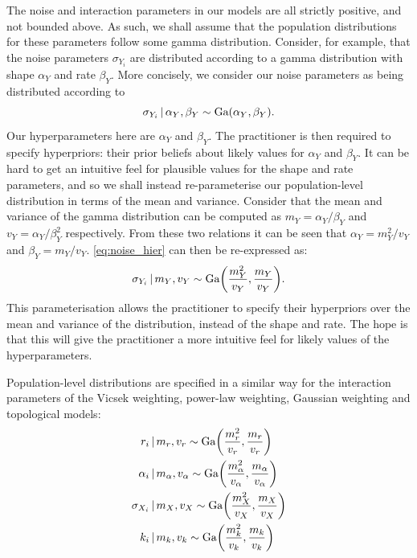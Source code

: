 The noise and interaction parameters in our models are all strictly positive,
and not bounded above. As such, we shall assume that the population
distributions for these parameters follow some gamma distribution. Consider,
for example, that the noise parameters $\sigma_{Y_i}$ are distributed according
to a gamma distribution with shape $\alpha_Y$ and rate $\beta_Y$. More
concisely, we consider our noise parameters as being distributed according to
\begin{equation}
    \label{eq:noise_hier}
    \sigma_{Y_i}\,|\,\alpha_Y,\beta_Y \sim \textrm{Ga}(\alpha_Y, \beta_Y).
\end{equation}
Our hyperparameters here are $\alpha_Y$ and $\beta_Y$. The practitioner is then
required to specify hyperpriors: their prior beliefs about likely values for
$\alpha_Y$ and $\beta_Y$. It can be hard to get an intuitive feel for plausible
values for the shape and rate parameters, and so we shall instead
re-parameterise our population-level distribution in terms of the mean and
variance. Consider that the mean and variance of the gamma distribution can be
computed as $m_Y = \alpha_Y / \beta_Y$ and $v_Y = \alpha_Y/\beta_Y^2$
respectively. From these two relations it can be seen that $\alpha_Y = m_Y^2 /
v_Y$ and $\beta_Y = m_Y / v_Y$. \cref{eq:noise_hier} can then be re-expressed
as:
\begin{equation}
    \label{eq:sigma_Y_hierarchy}
    \sigma_{Y_i}\,|\, m_Y, v_Y \sim \textrm{Ga}\bigg(\frac{m_Y^2}{v_Y},
                                              \frac{m_Y}{v_Y}\bigg).
\end{equation}
This parameterisation allows the practitioner to specify their hyperpriors over
the mean and variance of the distribution, instead of the shape and rate. The
hope is that this will give the practitioner a more intuitive feel for likely
values of the hyperparameters.

Population-level distributions are specified in a similar way for the
interaction parameters of the Vicsek weighting, power-law weighting, Gaussian
weighting and topological models:
\begin{align}
    r_i &\,|\, m_r, v_r  \sim \textrm{Ga}\bigg(\frac{m_r^2}{v_r}, \frac{m_r}{v_r}\bigg)\\
    \alpha_i &\,|\, m_{\alpha}, v_{\alpha}  \sim
        \textrm{Ga}\bigg(\frac{m_{\alpha}^2}{v_{\alpha}}, \frac{m_{\alpha}}{v_{\alpha}}\bigg)\\
    \sigma_{X_i} &\,|\, m_X, v_X  \sim \textrm{Ga}\bigg(\frac{m_X^2}{v_X}, \frac{m_X}{v_X}\bigg)
    \label{eq:sigma_X_hierarchy}\\
    k_i &\,|\, m_k, v_k  \sim \textrm{Ga}\bigg(\frac{m_k^2}{v_k}, \frac{m_k}{v_k}\bigg)
\end{align}

